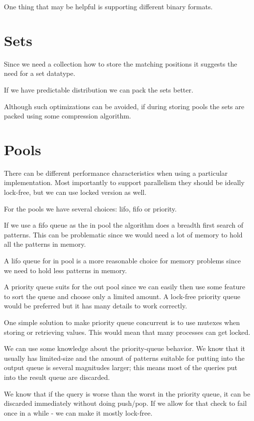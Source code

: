 One thing that may be helpful is supporting different binary formats.

\section{Sets}

Since we need a collection how to store the matching positions it suggests
the need for a set datatype.

If we have predictable distribution we can pack the sets better. 

Although such optimizations can be avoided, if during storing pools the
sets are packed using some compression algorithm.

\section{Pools}

There can be different performance characteristics when using a particular implementation. 
Most importantly to support parallelism they should be ideally lock-free, but we can use locked version as well.

For the pools we have several choices: lifo, fifo or priority.

If we use a fifo queue as the in pool the algorithm does a breadth first search of patterns.
This can be problematic since we would need a lot of memory to hold all the patterns in memory.

A lifo queue for in pool is a more reasonable choice for memory problems since we need to hold less patterns in memory.

A priority queue suits for the out pool since we can easily then use some feature to sort 
the queue and choose only a limited amount. A lock-free priority queue would be preferred
but it has many details to work correctly. 

One simple solution to make priority queue concurrent is to use mutexes when storing or
retrieving values. This would mean that many processes can get locked.

We can use some knowledge about the priority-queue behavior. We know that it usually
has limited-size and the amount of patterns suitable for putting into the output
queue is several magnitudes larger; this means most of the queries put into
the result queue are discarded. 

We know that if the query is worse than the worst in the priority queue, it can
be discarded immediately without doing push/pop. If we allow for that check
to fail once in a while - we can make it mostly lock-free.


